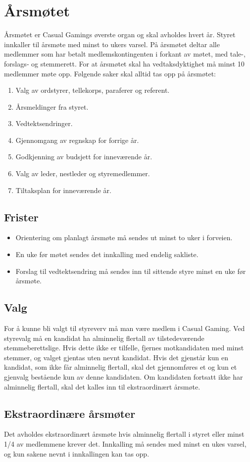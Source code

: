\chapter{Årsmøtet}
Årsmøtet er Casual Gamings øverste organ og skal avholdes hvert år. Styret innkaller til årsmøte med minst to ukers varsel. På årsmøtet deltar alle medlemmer som har betalt medlemskontingenten i forkant av møtet, med tale-, forslags‐ og stemmerett. For at årsmøtet skal ha vedtaksdyktighet må minst 10 medlemmer møte opp. Følgende saker skal alltid tas opp på årsmøtet:
\begin{enumerate}
    \item Valg av ordstyrer, tellekorps, paraferer og referent.
    \item Årsmeldinger fra styret.
    \item Vedtektsendringer.
    \item Gjennomgang av regnskap for forrige år.
    \item Godkjenning av budsjett for inneværende år.
    \item Valg av leder, nestleder og styremedlemmer.
    \item Tiltaksplan for inneværende år.
\end{enumerate}

\section{Frister}
\begin{itemize}
    \item Orientering om planlagt årsmøte må sendes ut minst to uker i forveien.
    \item En uke før møtet sendes det innkalling med endelig sakliste.
    \item Forslag til vedtektsendring må sendes inn til sittende styre minst en uke før årsmøte.
\end{itemize}

\section{Valg}
For å kunne bli valgt til styreverv må man være medlem i Casual Gaming. Ved styrevalg må en kandidat ha alminnelig flertall av tilstedeværende stemmeberettslige. Hvis dette ikke er tilfelle, fjernes motkandidaten med minst stemmer, og valget gjentas uten nevnt kandidat. Hvis det gjenstår kun en kandidat, som ikke får alminnelig flertall, skal det gjennomføres et og kun et gjenvalg bestående kun av denne kandidaten. Om kandidaten fortsatt ikke har alminnelig flertall, skal det kalles inn til ekstraordinært årsmøte.

\section{Ekstraordinære årsmøter}
Det avholdes ekstraordinært årsmøte hvis alminnelig flertall i styret eller minst 1/4 av medlemmene krever det. Innkalling må sendes med minst en ukes varsel, og kun sakene nevnt i innkallingen kan tas opp.
